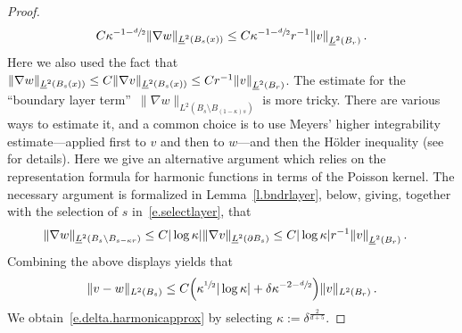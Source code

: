 \documentclass[11pt]{article} %
\numberwithin{equation}{section}
\theoremstyle{definition}
\let\originalleft\left
\let\originalright\right
\renewcommand{\left}{\mathopen{}\mathclose\bgroup\originalleft}
\renewcommand{\right}{\aftergroup\egroup\originalright}
\begin{document}
\begin{proof}
\begin{equation*}
C \kappa^{-1-\sfrac d2} \| \nabla w \|_{\underline{L}^2(B_s(x))} \leq C \kappa^{-1-\sfrac d2} r^{-1} \left\| v \right\|_{\underline{L}^2(B_{r})} \,.
\end{equation*}
Here we also used the fact that $\| \nabla w \|_{\underline{L}^2(B_s(x))}  \leq C \| \nabla v \|_{\underline{L}^2(B_s(x))} \leq C r^{-1} \left\| v \right\|_{\underline{L}^2(B_{r})}$. The estimate for the ``boundary layer term''~$\| \nabla w \|_{L^2 (B_{s} \setminus B_{(1-\kappa)s})}$ is more tricky. There are various ways to estimate it, and a common choice is to use Meyers' higher integrability estimate---applied first to $v$ and then to $w$---and then the H\"older inequality (see~\cite{AKMBook} for details). Here we give an alternative argument which relies on the representation formula for harmonic functions in terms of the Poisson kernel. The necessary argument is formalized in Lemma~\ref{l.bndrlayer}, below, giving, together with the selection of $s$ in~\eqref{e.selectlayer}, that
\begin{align*}  
\| \nabla w \|_{\underline{L}^2 (B_{s} \setminus B_{s-\kappa r})} 
& 
\leq
C  |\log \kappa|   \| \nabla v \|_{\underline{L}^2(\partial B_{s})}  \leq C |\log \kappa| r^{-1} \left\| v \right\|_{\underline{L}^2(B_{r})}
\,.
\end{align*}
Combining the above displays yields that
\begin{align*}  
\| v - w \|_{L^2(B_s)}  
\leq 
C \Bigl( \kappa^{\sfrac12} |\log \kappa |
+ \delta \kappa^{-2-\sfrac d2} \Bigr)  \| v  \|_{L^2(B_r)}
\,.
\end{align*}
We obtain~\eqref{e.delta.harmonicapprox} by selecting $\kappa := \delta^{\frac{2}{d+5}}$. 

\smallskip



\end{proof}
\end{document}
